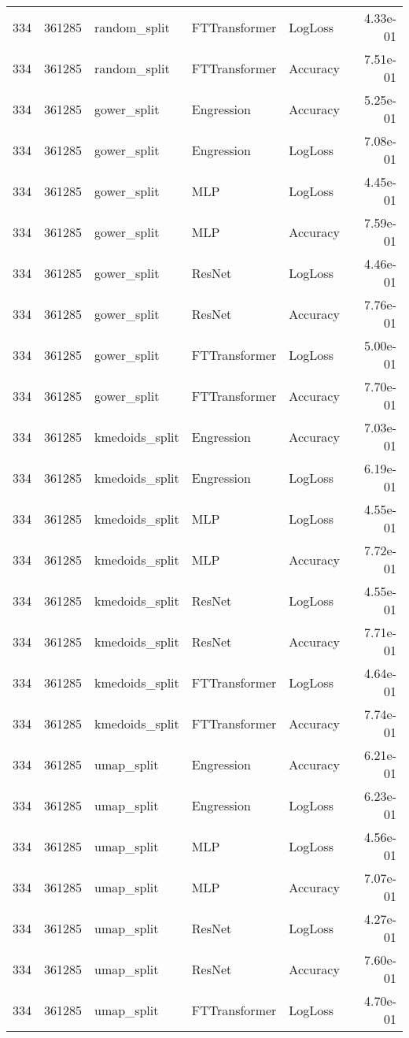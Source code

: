 \begin{tabular}{rrlllr}
334 & 361285 & random\_split & FTTransformer & LogLoss & 4.33e-01 \\
334 & 361285 & random\_split & FTTransformer & Accuracy & 7.51e-01 \\
334 & 361285 & gower\_split & Engression & Accuracy & 5.25e-01 \\
334 & 361285 & gower\_split & Engression & LogLoss & 7.08e-01 \\
334 & 361285 & gower\_split & MLP & LogLoss & 4.45e-01 \\
334 & 361285 & gower\_split & MLP & Accuracy & 7.59e-01 \\
334 & 361285 & gower\_split & ResNet & LogLoss & 4.46e-01 \\
334 & 361285 & gower\_split & ResNet & Accuracy & 7.76e-01 \\
334 & 361285 & gower\_split & FTTransformer & LogLoss & 5.00e-01 \\
334 & 361285 & gower\_split & FTTransformer & Accuracy & 7.70e-01 \\
334 & 361285 & kmedoids\_split & Engression & Accuracy & 7.03e-01 \\
334 & 361285 & kmedoids\_split & Engression & LogLoss & 6.19e-01 \\
334 & 361285 & kmedoids\_split & MLP & LogLoss & 4.55e-01 \\
334 & 361285 & kmedoids\_split & MLP & Accuracy & 7.72e-01 \\
334 & 361285 & kmedoids\_split & ResNet & LogLoss & 4.55e-01 \\
334 & 361285 & kmedoids\_split & ResNet & Accuracy & 7.71e-01 \\
334 & 361285 & kmedoids\_split & FTTransformer & LogLoss & 4.64e-01 \\
334 & 361285 & kmedoids\_split & FTTransformer & Accuracy & 7.74e-01 \\
334 & 361285 & umap\_split & Engression & Accuracy & 6.21e-01 \\
334 & 361285 & umap\_split & Engression & LogLoss & 6.23e-01 \\
334 & 361285 & umap\_split & MLP & LogLoss & 4.56e-01 \\
334 & 361285 & umap\_split & MLP & Accuracy & 7.07e-01 \\
334 & 361285 & umap\_split & ResNet & LogLoss & 4.27e-01 \\
334 & 361285 & umap\_split & ResNet & Accuracy & 7.60e-01 \\
334 & 361285 & umap\_split & FTTransformer & LogLoss & 4.70e-01 \\

\end{tabular}

